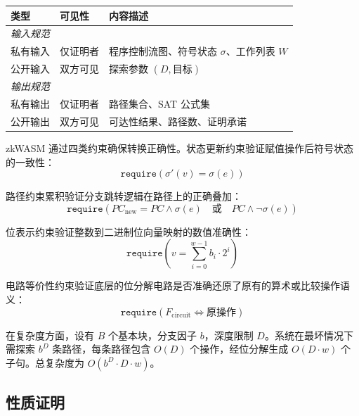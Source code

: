 \begin{table}[htbp]
\centering
{}
\label{tab:zkwasm-io-symbolic}
\begin{tabular}{llp{7.5cm}}
\toprule
类型 & 可见性 & 内容描述 \\
\midrule
\textit{输入规范} & & \\
私有输入 & 仅证明者 & 程序控制流图、符号状态 $\sigma$、工作列表 $W$ \\
公开输入 & 双方可见 & 探索参数 $(D, \text{目标})$ \\
\midrule
\textit{输出规范} & & \\
私有输出 & 仅证明者 & 路径集合、SAT 公式集 \\
公开输出 & 双方可见 & 可达性结果、路径数、证明承诺 \\
\bottomrule
\end{tabular}
\end{table}

zkWASM 通过四类约束确保转换正确性。状态更新约束验证赋值操作后符号状态的一致性：
\begin{equation}
\texttt{require}(\sigma'(v) = \sigma(e))
\end{equation}

路径约束累积验证分支跳转逻辑在路径上的正确叠加：
\begin{equation}
\texttt{require}(PC_{\text{new}} = PC \wedge \sigma(e) \quad \text{或} \quad PC \wedge \neg\sigma(e))
\end{equation}

位表示约束验证整数到二进制位向量映射的数值准确性：
\begin{equation}
\texttt{require}\left(v = \sum_{i=0}^{w-1} b_i \cdot 2^i\right)
\end{equation}

电路等价性约束验证底层的位分解电路是否准确还原了原有的算术或比较操作语义：
\begin{equation}
\texttt{require}(F_{\text{circuit}} \Leftrightarrow \text{原操作})
\end{equation}

在复杂度方面，设有 $B$ 个基本块，分支因子 $b$，深度限制 $D$。系统在最坏情况下需探索 $b^D$ 条路径，每条路径包含 $O(D)$ 个操作，经位分解生成 $O(D \cdot w)$ 个子句。总复杂度为 $O(b^D \cdot D \cdot w)$。

\subsection{性质证明}

